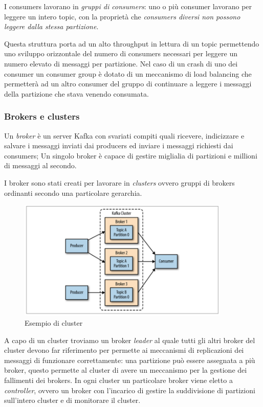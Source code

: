 \documentclass[]{article}
\begin{document}
\newpage

I consumers lavorano in \emph{gruppi di consumers}: uno o più consumer
lavorano per leggere un intero topic, con la proprietà che
\emph{consumers diversi non possono leggere dalla stessa partizione}.

Questa struttura porta ad un alto throughput in lettura di un topic
permettendo uno sviluppo orizzontale del numero di consumers necessari
per leggere un numero elevato di messaggi per partizione. Nel caso di un
crash di uno dei consumer un consumer group è dotato di un meccanismo di
load balancing che permetterà ad un altro consumer del gruppo di
continuare a leggere i messaggi della partizione che stava venendo
consumata.

\subsubsection{Brokers e clusters}\label{brokers-e-clusters}

Un \emph{broker} è un server Kafka con svariati compiti quali ricevere,
indicizzare e salvare i messaggi inviati dai producers ed inviare i
messaggi richiesti dai consumers; Un singolo broker è capace di gestire
miglialia di partizioni e millioni di messaggi al secondo.

I broker sono stati creati per lavorare in \emph{clusters} ovvero gruppi
di brokers ordinanti secondo una particolare gerarchia.

\begin{figure}
\centering
\includegraphics[width=0.90000\textwidth]{../images/kafka-cluster.png}
\caption{Esempio di cluster \label{figure_5}}
\end{figure}

A capo di un cluster troviamo un broker \emph{leader} al quale tutti gli
altri broker del cluster devono far riferimento per permette ai
meccanismi di replicazioni dei messaggi di funzionare correttamente: una
partizione può essere assegnata a più broker, questo permette al cluster
di avere un meccanismo per la gestione dei fallimenti dei brokers. In
ogni cluster un particolare broker viene eletto a \emph{controller},
ovvero un broker con l'incarico di gestire la suddivisione di partizioni
sull'intero cluster e di monitorare il cluster.
\end{document}
